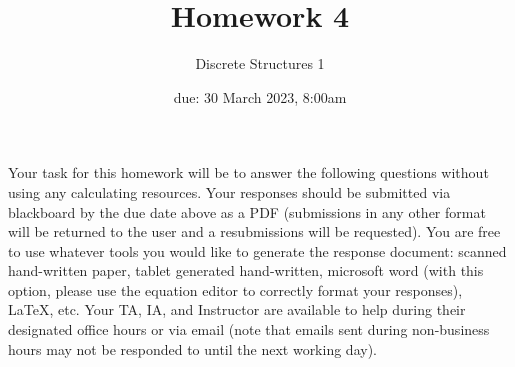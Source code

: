 \documentclass[11pt, oneside]{article}   	%
\title{Homework 4}
\author{Discrete Structures 1}
\date{due: 30 March 2023, 8:00am}							%
\begin{document}
\maketitle

Your task for this homework will be to answer the following questions without using any calculating resources. 
Your responses should be submitted via blackboard by the due date above as a PDF (submissions in any other format will be returned to the user and a resubmissions will be requested). 
You are free to use whatever tools you would like to generate the response document: 
scanned hand-written paper, 
tablet generated hand-written, 
microsoft word (with this option, please use the equation editor to correctly format your responses), 
\LaTeX, etc.
Your TA, IA, and Instructor are available to help during their designated office hours or via email 
(note that emails sent during non-business hours may not be responded to until the next working day). 
\end{document}
